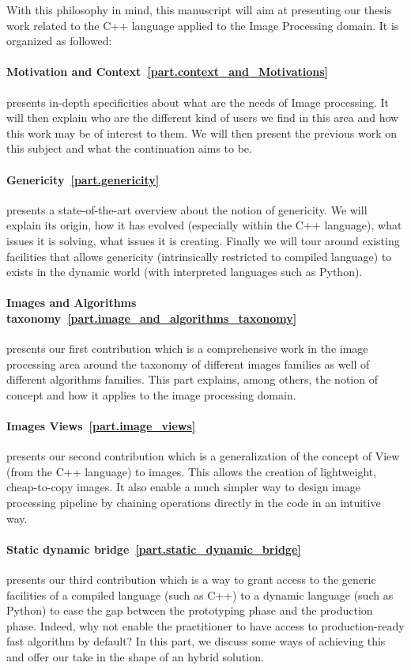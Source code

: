 With this philosophy in mind, this manuscript will aim at presenting our thesis work related to the C++ language applied
to the Image Processing domain. It is organized as followed:

\paragraph{Motivation and Context~\ref{part.context_and_Motivations}} presents in-depth specificities about what are the
needs of Image processing. It will then explain who are the different kind of users we find in this area and how this
work may be of interest to them. We will then present the previous work on this subject and what the continuation aims
to be.

\paragraph{Genericity~\ref{part.genericity}} presents a state-of-the-art overview about the notion of genericity. We
will explain its origin, how it has evolved (especially within the C++ language), what issues it is solving, what issues
it is creating. Finally we will tour around existing facilities that allows genericity (intrinsically restricted to
compiled language) to exists in the dynamic world (with interpreted languages such as Python).

\paragraph{Images and Algorithms taxonomy~\ref{part.image_and_algorithms_taxonomy}} presents our first contribution
which is a comprehensive work in the image processing area around the taxonomy of different images families as well of
different algorithms families. This part explains, among others, the notion of concept and how it applies to the
image processing domain.

\paragraph{Images Views~\ref{part.image_views}} presents our second contribution which is a generalization of the
concept of View (from the C++ language) to images. This allows the creation of lightweight, cheap-to-copy images. It
also enable a much simpler way to design image processing pipeline by chaining operations directly in the code in an
intuitive way.

\paragraph{Static dynamic bridge~\ref{part.static_dynamic_bridge}} presents our third contribution which is a way to
grant access to the generic facilities of a compiled language (such as C++) to a dynamic language (such as Python) to
ease the gap between the prototyping phase and the production phase. Indeed, why not enable the practitioner to have
access to production-ready fast algorithm by default? In this part, we discuss some ways of achieving this and offer our
take in the shape of an hybrid solution.

